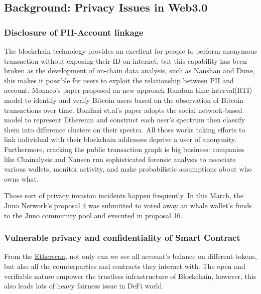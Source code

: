 \documentclass{article}
\begin{document}
\subsection{Background: Privacy Issues in Web3.0}

\subsubsection{Disclosure of PII-Account linkage}

The blockchain technology provides an excellent for people to perform anonymous transaction without exposing their ID on internet, but this capability has been broken as the development of on-chain data analysis, such as Nanshan and Dune, this makes it possible for users to exploit the relationship between PII and account. Monaco's paper \cite{monaco2015identifying} 
proposed an new approach Random time-interval(RTI) model to identify and verify Bitcoin users based on the observation of Bitcoin transactions over time.  Bonifazi et.al's paper \cite{bonifazi2022defining} adopts the social network-based model to represent Ethereum and construct each user's spectrum then classify them into difference clusters on their spectra.  All those works taking efforts to link individual with their blockchain addresses deprive a user of anonymity. Furthermore, cracking the public transaction graph is big business: companies like Chainalysis and Nansen run sophisticated forensic analysis to associate various wallets, monitor activity, and make probabilistic assumptions about who owns what.

Those sort of privacy invasion incidents happen frequently. In this March, the Juno Network's proposal \href{https://www.mintscan.io/juno/proposals/4}{4} was submitted to voted away an whale wallet's funds to the Juno community pool and executed in proposal \href{https://www.mintscan.io/juno/proposals/16}{16}.  

\subsubsection{Vulnerable privacy and confidentiality of Smart Contract}

From the \href{etherscan.io}{Etherscan}, not only can we see all account's balance on different tokens, but also all the counterparties and contracts they interact with. The open and verifiable nature empower the trustless infrastructure of Blockchain, however, this also leads lots of heavy fairness issue in DeFi world. 
\end{document}
